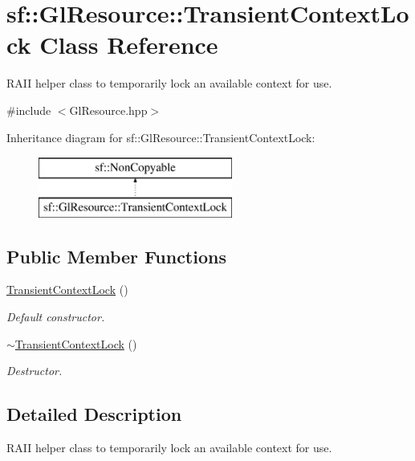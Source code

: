 \hypertarget{classsf_1_1_gl_resource_1_1_transient_context_lock}{\section{sf\-:\-:Gl\-Resource\-:\-:Transient\-Context\-Lock Class Reference}
\label{classsf_1_1_gl_resource_1_1_transient_context_lock}
}


R\-A\-I\-I helper class to temporarily lock an available context for use.  




{\ttfamily \#include $<$Gl\-Resource.\-hpp$>$}

Inheritance diagram for sf\-:\-:Gl\-Resource\-:\-:Transient\-Context\-Lock\-:\begin{figure}[H]
\begin{center}
\leavevmode
\includegraphics[height=2.000000cm]{classsf_1_1_gl_resource_1_1_transient_context_lock}
\end{center}
\end{figure}
\subsection*{Public Member Functions}
\begin{DoxyCompactItemize}
\item 
\hyperlink{classsf_1_1_gl_resource_1_1_transient_context_lock_a6434ee8f0380c300b361be038f37123a}{Transient\-Context\-Lock} ()
\begin{DoxyCompactList}\small\item\em Default constructor. \end{DoxyCompactList}\item 
\hyperlink{classsf_1_1_gl_resource_1_1_transient_context_lock_a169285281b252ac8d54523b0fcc4b814}{$\sim$\-Transient\-Context\-Lock} ()
\begin{DoxyCompactList}\small\item\em Destructor. \end{DoxyCompactList}\end{DoxyCompactItemize}


\subsection{Detailed Description}
R\-A\-I\-I helper class to temporarily lock an available context for use. 


